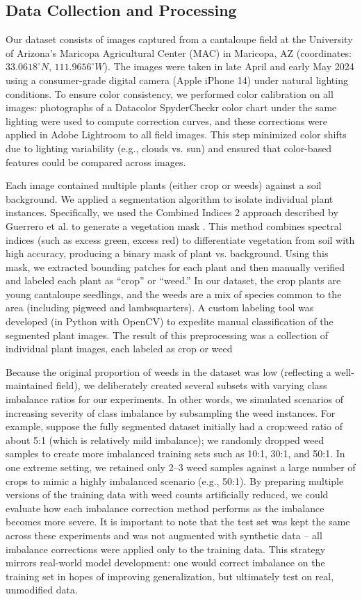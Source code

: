 \documentclass[agriengineering,article,submit,pdftex,moreauthors]{Definitions/mdpi}
\begin{document}
\subsection{Data Collection and Processing}
Our dataset consists of images captured from a cantaloupe field at the University of Arizona’s Maricopa Agricultural Center (MAC) in Maricopa, AZ (coordinates: $33.0618^\circ N$, $111.9656^\circ W$). The images were taken in late April and early May 2024 using a consumer-grade digital camera (Apple iPhone 14) under natural lighting conditions. To ensure color consistency, we performed color calibration on all images: photographs of a Datacolor SpyderCheckr color chart under the same lighting were used to compute correction curves, and these corrections were applied in Adobe Lightroom to all field images. This step minimized color shifts due to lighting variability (e.g., clouds vs. sun) and ensured that color-based features could be compared across images.

Each image contained multiple plants (either crop or weeds) against a soil background. We applied a segmentation algorithm to isolate individual plant instances. Specifically, we used the Combined Indices 2 approach described by Guerrero et al. to generate a vegetation mask \cite{Guerrero2012-zi}.  This method combines spectral indices (such as excess green, excess red) to differentiate vegetation from soil with high accuracy, producing a binary mask of plant vs. background. Using this mask, we extracted bounding patches for each plant and then manually verified and labeled each plant as “crop” or “weed.” In our dataset, the crop plants are young cantaloupe seedlings, and the weeds are a mix of species common to the area (including pigweed and lambsquarters). A custom labeling tool was developed (in Python with OpenCV) to expedite manual classification of the segmented plant images. The result of this preprocessing was a collection of individual plant images, each labeled as crop or weed
%

Because the original proportion of weeds in the dataset was low (reflecting a well-maintained field), we deliberately created several subsets with varying class imbalance ratios for our experiments. In other words, we simulated scenarios of increasing severity of class imbalance by subsampling the weed instances. For example, suppose the fully segmented dataset initially had a crop:weed ratio of about 5:1 (which is relatively mild imbalance); we randomly dropped weed samples to create more imbalanced training sets such as 10:1, 30:1, and 50:1. In one extreme setting, we retained only 2–3 weed samples against a large number of crops to mimic a highly imbalanced scenario (e.g., 50:1). By preparing multiple versions of the training data with weed counts artificially reduced, we could evaluate how each imbalance correction method performs as the imbalance becomes more severe. It is important to note that the test set was kept the same across these experiments and was not augmented with synthetic data – all imbalance corrections were applied only to the training data. This strategy mirrors real-world model development: one would correct imbalance on the training set in hopes of improving generalization, but ultimately test on real, unmodified data.
%
\end{document}

